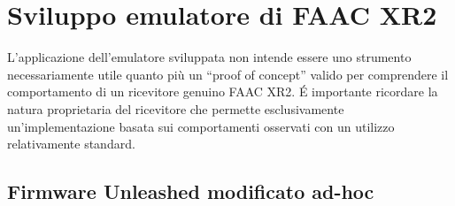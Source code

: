 \chapter{Sviluppo emulatore di FAAC XR2}
\label{cha:development}

L’applicazione \cite{app} dell’emulatore sviluppata non intende essere uno strumento necessariamente utile quanto più un “proof of concept” valido per comprendere il comportamento di un ricevitore genuino FAAC XR2. É importante ricordare la natura proprietaria del ricevitore che permette esclusivamente un’implementazione basata sui comportamenti osservati con un utilizzo relativamente standard.

\section{Firmware Unleashed modificato ad-hoc}
\label{sec:unleashed_mod}

